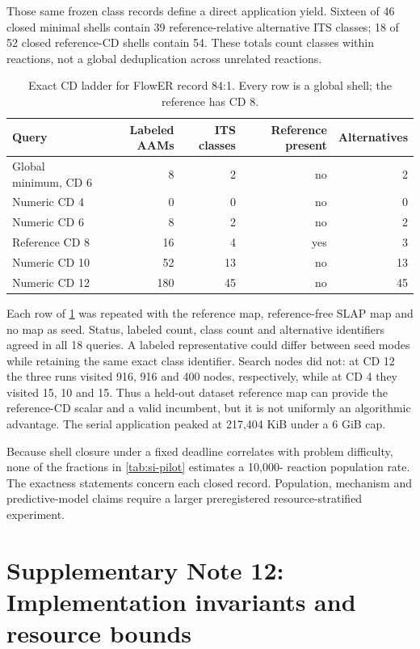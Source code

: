 \documentclass[11pt]{article}
\theoremstyle{definition}
\begin{document}
Those same frozen class records define a direct application yield.  Sixteen of
46 closed minimal shells contain 39 reference-relative alternative ITS classes;
18 of 52 closed reference-CD shells contain 54.  These totals count classes
within reactions, not a global deduplication across unrelated reactions.

\begin{table}[ht]
\centering
\caption{Exact CD ladder for FlowER record 84:1.  Every row is a global shell;
the reference has CD 8.}
\label{tab:si-alternative-case}
\begin{tabular}{lrrrr}
\toprule
Query & Labeled AAMs & ITS classes & Reference present & Alternatives \\
\midrule
Global minimum, CD 6 & 8 & 2 & no & 2 \\
Numeric CD 4 & 0 & 0 & no & 0 \\
Numeric CD 6 & 8 & 2 & no & 2 \\
Reference CD 8 & 16 & 4 & yes & 3 \\
Numeric CD 10 & 52 & 13 & no & 13 \\
Numeric CD 12 & 180 & 45 & no & 45 \\
\bottomrule
\end{tabular}
\end{table}

Each row of \cref{tab:si-alternative-case} was repeated with the reference map,
reference-free SLAP map and no map as seed.  Status, labeled count, class count
and alternative identifiers agreed in all 18 queries.  A labeled
representative could differ between seed modes while retaining the same exact
class identifier.  Search nodes did not:
at CD 12 the three runs visited 916, 916 and 400 nodes, respectively, while at
CD 4 they visited 15, 10 and 15.  Thus a held-out dataset reference map can provide the
reference-CD scalar and a valid incumbent, but it is not uniformly an
algorithmic advantage.  The serial application peaked at 217,404 KiB under a
6 GiB cap.

Because shell closure under a fixed deadline correlates with problem
difficulty, none of the fractions in \cref{tab:si-pilot} estimates a 10,000-
reaction population rate.  The exactness statements concern each closed
record.  Population, mechanism and predictive-model claims require a larger
preregistered resource-stratified experiment.

\section{Supplementary Note 12: Implementation invariants and resource bounds}
\end{document}
